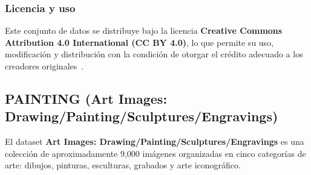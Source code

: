 \subsubsection{Licencia y uso}
Este conjunto de datos se distribuye bajo la licencia
\textbf{Creative Commons Attribution 4.0 International (CC BY 4.0)}, lo que permite su uso, modificación y distribución
con la condición de otorgar el crédito adecuado a los creadores originales~\cite{moroneyLaurenceMoroneyAI}.


\subsection{PAINTING (Art Images: Drawing/Painting/Sculptures/Engravings)}\label{subsec:painting}
El dataset \textbf{Art Images: Drawing/Painting/Sculptures/Engravings} es una colección de aproximadamente 9,000
imágenes organizadas en cinco categorías de arte: dibujos, pinturas, esculturas, grabados y arte iconográfico.

